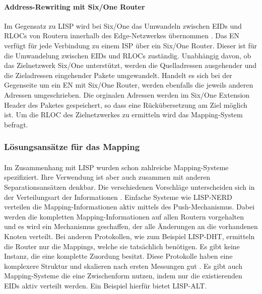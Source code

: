 \paragraph{Address-Rewriting mit Six/One Router}
Im Gegensatz zu LISP wird bei Six/One das Umwandeln zwischen EIDs und RLOCs von Routern innerhalb des Edge-Netzwerkes übernommen \cite{vogt:2008:six}. Das EN verfügt für jede Verbindung zu einem ISP über ein Six/One Router. Dieser ist für die Umwandelung zwischen EIDs und RLOCs zuständig. Unabhängig davon, ob das Zielnetzwerk Six/One unterstützt, werden die Quelladressen ausgehender und die Zieladressen eingehender Pakete umgewandelt. Handelt es sich bei der Gegenseite um ein EN mit Six/One Router, werden ebenfalls die jeweils anderen Adressen umgeschrieben. Die orginalen Adressen werden im Six/One Extension Header des Paketes gespeichert, so dass eine Rückübersetzung am Ziel möglich ist. Um die RLOC des Zielnetzwerkes zu ermitteln wird das Mapping-System befragt.

\subsubsection{Lösungsansätze für das Mapping}
\paragraph{}
Im Zusammenhang mit LISP wurden schon zahlreiche Mapping-Systeme spezifiziert. Ihre Verwendung ist aber auch zusammen mit anderen Separationsansätzen denkbar. Die verschiedenen Vorschläge unterscheiden sich in der Verteilungsart der Informationen \cite{mathy:2008:dht}. Einfache Systeme wie LISP-NERD verteilen die Mapping-Informationen aktiv mittels des Push-Mechanismus. Dabei werden die kompletten Mapping-Informationen auf allen Routern vorgehalten und es wird ein Mechanismus geschaffen, der alle Änderungen an die vorhandenen Knoten verteilt. Bei anderen Protokollen, wie zum Beispiel LISP-DHT, ermitteln die Router nur die Mappings, welche sie tatsächlich benötigen. Es gibt keine Instanz, die eine komplette Zuordung besitzt. Diese Protokolle haben eine komplexere Struktur und skalieren nach ersten Messungen gut \cite{iannone:2007:cost}. Es gibt auch Mapping-Systeme die eine Zwischenform nutzen, indem nur die existierenden EIDs aktiv verteilt werden. Ein Beispiel hierfür bietet LISP-ALT.

